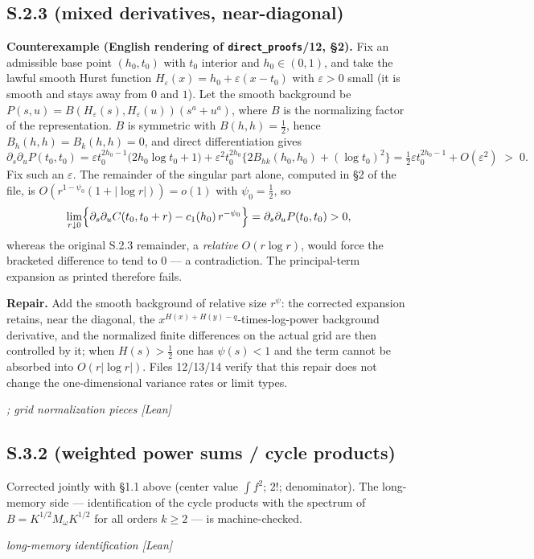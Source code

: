 \documentclass[11pt]{article}
\theoremstyle{definition}
\theoremstyle{remark}
\newcommand{\statustag}[1]{%
  \par\nobreak\begingroup\footnotesize\itshape\raggedleft #1\par\endgroup}
\newcommand{\Wlean}{[Lean]}
\newcommand{\Wwritten}{[written]}
\begin{document}
\subsection{S.2.3 (mixed derivatives, near-diagonal)}
\textbf{Counterexample (English rendering of \texttt{direct\_proofs}/12,
\S2).} Fix an admissible base point $(h_0,t_0)$ with $t_0$ interior and
$h_0\in(0,1)$, and take the lawful smooth Hurst function
$H_\varepsilon(x)=h_0+\varepsilon(x-t_0)$ with $\varepsilon>0$ small (it is
smooth and stays away from $0$ and $1$). Let the smooth background be
$P(s,u)=B(H_\varepsilon(s),H_\varepsilon(u))(s^{a}+u^{a})$, where $B$ is the
normalizing factor of the representation. $B$ is symmetric with
$B(h,h)=\tfrac12$, hence $B_h(h,h)=B_k(h,h)=0$, and direct differentiation
gives
\[
\partial_s\partial_uP(t_0,t_0)
=\varepsilon t_0^{2h_0-1}\bigl(2h_0\log t_0+1\bigr)
+\varepsilon^{2}t_0^{2h_0}\bigl\{2B_{hk}(h_0,h_0)+(\log t_0)^{2}\bigr\}
=\tfrac12\varepsilon t_0^{2h_0-1}+O(\varepsilon^{2})\;>\;0 .
\]
Fix such an $\varepsilon$. The remainder of the singular part alone,
computed in \S2 of the file, is $O(r^{1-\psi_0}(1+|\log r|))=o(1)$ with
$\psi_0=\tfrac12$, so
\[
\lim_{r\downarrow0}\Bigl\{\partial_s\partial_uC(t_0,t_0+r)
-c_1(h_0)\,r^{-\psi_0}\Bigr\}=\partial_s\partial_uP(t_0,t_0)>0 ,
\]
whereas the original S.2.3 remainder, a \emph{relative} $O(r\log r)$, would
force the bracketed difference to tend to $0$ --- a contradiction. The
principal-term expansion as printed therefore fails.

\textbf{Repair.} Add the smooth background of relative size $r^{\psi}$: the
corrected expansion retains, near the diagonal, the
$x^{H(x)+H(y)-q}$-times-log-power background derivative, and the normalized
finite differences on the actual grid are then controlled by it; when
$H(s)>\tfrac12$ one has $\psi(s)<1$ and the term cannot be absorbed into
$O(r|\log r|)$. Files 12/13/14 verify that this repair does not change the
one-dimensional variance rates or limit types.
\statustag{\Wwritten; grid normalization pieces \Wlean}

\smallskip{}

\subsection{S.3.2 (weighted power sums / cycle products)}
Corrected jointly with \S1.1 above (center value $\int f^2$; $2!$;
denominator). The long-memory side --- identification of the cycle products
with the spectrum of $B=K^{1/2}M_\omega K^{1/2}$ for all orders $k\ge2$ ---
is machine-checked. \statustag{long-memory identification \Wlean}
\end{document}
